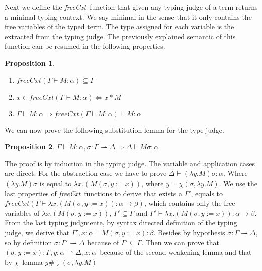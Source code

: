 \documentclass{article}
\newcommand{\freer}[2]{\ensuremath{#1 *#2}}
\newcommand{\upd}[3]{\ensuremath{#1, #2 {:=} #3}}
\newtheorem{prop}{Proposition}
\newcommand{\type}[3]{\ensuremath{#1 \vdash #2 : #3}}
\newcommand{\goes}[3]{\ensuremath{#1 : #2 \rightharpoonup #3}}
\newcommand{\restfresh}[3]{\ensuremath{#1 \mathbin{\#\!\!\downharpoonright} (#2,#3)}}
\begin{document}
Next we define the \emph{freeCxt}\ function that given any typing judge of a term returns a minimal typing context. We say minimal in the sense that it only contains the free variables of the typed term. The type assigned for each variable is the extracted from the typing judge. The previously explained semantic of this function can be resumed in the following properties. 

\begin{prop}
  \begin{enumerate}
  \item $freeCxt(\type{\Gamma}{M}{\alpha}) \subseteq \Gamma$
  \item $x \in freeCxt(\type{\Gamma}{M}{\alpha}) \Leftrightarrow \freer{x}{M}$
  \item $\type{\Gamma}{M}{\alpha} \Rightarrow \type{freeCxt(\type{\Gamma}{M}{\alpha})}{M}{\alpha} $
  \end{enumerate}
\end{prop}

We can now prove the following substitution lemma for the type judge. 

\begin{prop}
  $\type{\Gamma}{M}{\alpha}, \goes{\sigma}{\Gamma}{\Delta} \Rightarrow \type{\Delta}{M \sigma}{\alpha}$
\end{prop}

The proof is by induction in the typing judge. The variable and application cases are direct. For the abstraction case we have to prove \type{\Delta}{(\lambda y. M) \sigma}{\alpha}. Where $(\lambda y. M) \sigma$ is equal to $\lambda x . (M (\upd{\sigma}{y}{x}))$, where $y = \chi (\sigma , \lambda y . M)$. We use the last properties of \emph{freeCxt}\ functions to derive that exists a $\Gamma'$, equals to $freeCxt(\type{\Gamma}{\lambda x . (M (\upd{\sigma}{y}{x}))}{\alpha \rightarrow \beta})$, which contains only the free variables of $\lambda x . (M (\upd{\sigma}{y}{x}))$, $\Gamma' \subseteq \Gamma$ and $\type{\Gamma'}{{\lambda x . (M (\upd{\sigma}{y}{x}))}}{\alpha \rightarrow \beta}$. From the last typing judgmente, by syntax directed definition of the typing judge, we derive that $\type{\Gamma', x : \alpha}{M (\upd{\sigma}{y}{x})}{\beta}$. Besides by hypothesis $\goes{\sigma}{\Gamma}{\Delta}$, so by definition \goes{\sigma}{\Gamma'}{\Delta} because of $\Gamma' \subseteq \Gamma$. Then we can prove that $\goes{(\upd{\sigma}{y}{x})}{\Gamma , y : \alpha}{\Delta , x : \alpha}$\ because of the second weakening lemma and that by $\chi$\ lemma \restfresh{y}{\sigma}{\lambda y.M}
\end{document}
